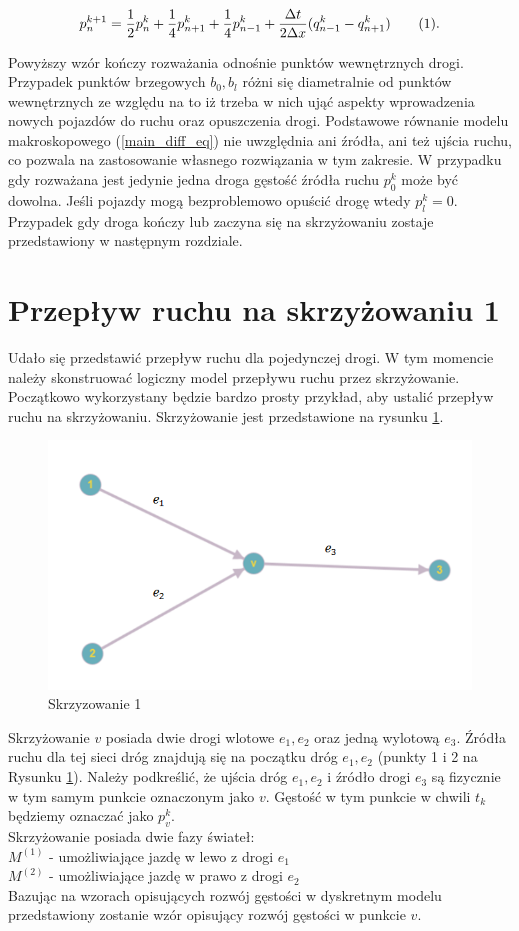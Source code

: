 \documentclass[12pt]{book}
\newcommand\addtag{\refstepcounter{equation}\tag{\theequation}}
\begin{document}
\[ p_n^{k+1} =\frac{1}{2}p_n^k+\frac{1}{4}p_{n+1}^k+\frac{1}{4}p_{n-1}^k  +\frac{\Delta t}{2\Delta x}(q^k_{n-1}-q^k_{n+1})  \addtag \label{eq:final_normal_development}.\]


Powyższy wzór kończy rozważania odnośnie punktów wewnętrznych drogi.
Przypadek punktów brzegowych $b_0,b_l$ różni się diametralnie od punktów wewnętrznych ze względu na to iż trzeba w nich ująć aspekty wprowadzenia nowych pojazdów do ruchu oraz opuszczenia drogi. Podstawowe równanie modelu makroskopowego (\ref{main_diff_eq}) nie uwzględnia ani źródła, ani też ujścia ruchu, co pozwala na zastosowanie własnego rozwiązania w tym zakresie. W przypadku gdy rozważana jest jedynie jedna droga gęstość źródła ruchu $p_0^k$ może być dowolna. Jeśli pojazdy mogą bezproblemowo opuścić drogę wtedy $p_l^k=0$. Przypadek gdy droga kończy lub zaczyna się na skrzyżowaniu zostaje przedstawiony w następnym rozdziale.

\section{Przepływ ruchu na skrzyżowaniu 1}
Udało się przedstawić przepływ ruchu dla pojedynczej drogi. W tym momencie należy skonstruować logiczny model przepływu ruchu przez skrzyżowanie. Początkowo wykorzystany będzie bardzo prosty przykład, aby ustalić przepływ ruchu na skrzyżowaniu. Skrzyżowanie jest przedstawione na rysunku \ref{fig:skrz_1}.
\begin{figure}[H]
  \centering
    \includegraphics[width=14cm]{skrz_1}
 \caption{Skrzyzowanie 1}
 \label{fig:skrz_1}
\end{figure}
Skrzyżowanie $v$ posiada dwie drogi wlotowe $e_1,e_2$ oraz jedną wylotową $e_3$. Źródła ruchu dla tej sieci dróg znajdują się na początku dróg $e_1,e_2$ (punkty 1 i 2 na Rysunku \ref{fig:skrz_1}). Należy podkreślić, że ujścia dróg $e_1,e_2$ i źródło drogi $e_3$ są fizycznie w tym samym punkcie oznaczonym jako $v$. Gęstość w tym punkcie w chwili $t_k$ będziemy oznaczać jako $p_v^k$.\\
Skrzyżowanie posiada dwie fazy świateł:\\
$M^{(1)}$ - umożliwiające jazdę w lewo z drogi $e_1$\\
$M^{(2)}$ - umożliwiające jazdę w prawo z drogi $e_2$ \\
Bazując na wzorach opisujących rozwój gęstości w dyskretnym modelu   przedstawiony zostanie wzór opisujący rozwój gęstości w punkcie $v$.
\end{document}
